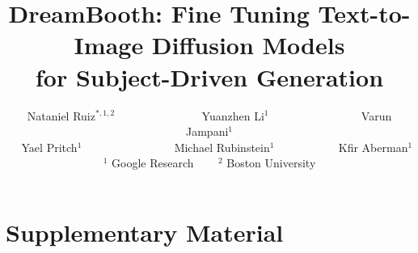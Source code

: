 \documentclass[10pt,twocolumn,letterpaper]{article}
\begin{document}
\title{\vspace{-.25in}DreamBooth: Fine Tuning Text-to-Image Diffusion Models \\ for Subject-Driven Generation\vspace{-.1in}}

\author{
  Nataniel Ruiz$^{*,1,2}$ ~~~~~~~~~~~~~~ Yuanzhen Li$^{1}$ ~~~~~~~~~~~~~~~ Varun Jampani$^{1}$ \\ ~~ Yael Pritch$^{1}$ ~~~~~~~~~~~~~~~ Michael Rubinstein$^{1}$ ~~~~~~~~~~ Kfir Aberman$^{1}$\\
  $^1$ Google Research ~~~ $^2$  Boston University\\
}
















{\small


}

\raggedbottom
\pagebreak
\clearpage

\section*{\LARGE Supplementary Material}


\end{document}
